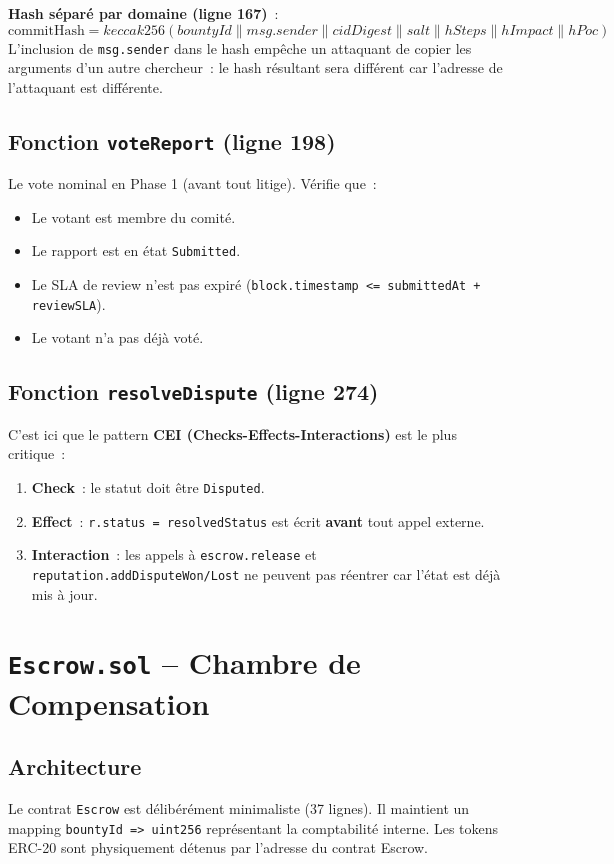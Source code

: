 \documentclass[12pt, a4paper]{report}
\begin{document}
\textbf{Hash s\'{e}par\'{e} par domaine (ligne 167)}~:
$$\text{commitHash} = keccak256(bountyId \| msg.sender \| cidDigest \| salt \| hSteps \| hImpact \| hPoc)$$
L'inclusion de \texttt{msg.sender} dans le hash emp\^{e}che un attaquant de copier les arguments d'un autre chercheur~: le hash r\'{e}sultant sera diff\'{e}rent car l'adresse de l'attaquant est diff\'{e}rente.

\subsection{Fonction \texttt{voteReport} (ligne 198)}
Le vote nominal en Phase 1 (avant tout litige). V\'{e}rifie que~:
\begin{itemize}
    \item Le votant est membre du comit\'{e}.
    \item Le rapport est en \'{e}tat \texttt{Submitted}.
    \item Le SLA de review n'est pas expir\'{e} (\texttt{block.timestamp <= submittedAt + reviewSLA}).
    \item Le votant n'a pas d\'{e}j\`{a} vot\'{e}.
\end{itemize}

\subsection{Fonction \texttt{resolveDispute} (ligne 274)}
C'est ici que le pattern \textbf{CEI (Checks-Effects-Interactions)} est le plus critique~:
\begin{enumerate}
    \item \textbf{Check}~: le statut doit \^{e}tre \texttt{Disputed}.
    \item \textbf{Effect}~: \texttt{r.status = resolvedStatus} est \'{e}crit \textbf{avant} tout appel externe.
    \item \textbf{Interaction}~: les appels \`{a} \texttt{escrow.release} et \texttt{reputation.addDisputeWon/Lost} ne peuvent pas r\'{e}entrer car l'\'{e}tat est d\'{e}j\`{a} mis \`{a} jour.
\end{enumerate}

\section{\texttt{Escrow.sol} -- Chambre de Compensation}

\subsection{Architecture}
Le contrat \texttt{Escrow} est d\'{e}lib\'{e}r\'{e}ment minimaliste (37 lignes). Il maintient un mapping \texttt{bountyId => uint256} repr\'{e}sentant la comptabilit\'{e} interne. Les tokens ERC-20 sont physiquement d\'{e}tenus par l'adresse du contrat Escrow.
\end{document}
